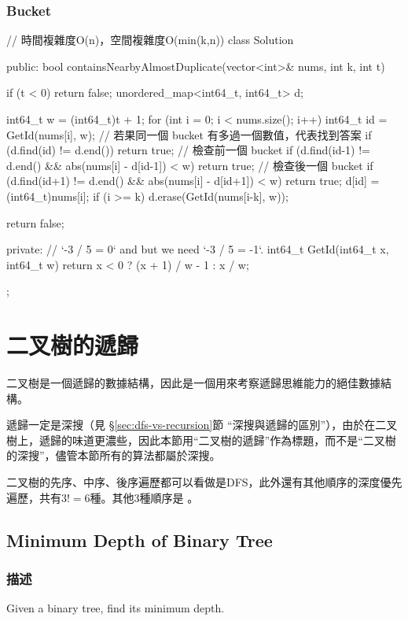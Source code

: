 \subsubsection{Bucket}
\begin{Code}
// 時間複雜度O(n)，空間複雜度O(min(k,n))
class Solution {
public:
    bool containsNearbyAlmostDuplicate(vector<int>& nums, int k, int t) {
        if (t < 0) return false;
        unordered_map<int64_t, int64_t> d;

        int64_t w = (int64_t)t + 1;
        for (int i = 0; i < nums.size(); i++)
        {
            int64_t id = GetId(nums[i], w);
            // 若果同一個 bucket 有多過一個數值，代表找到答案
            if (d.find(id) != d.end())
                return true;
            // 檢查前一個 bucket
            if (d.find(id-1) != d.end() && abs(nums[i] - d[id-1]) < w)
                return true;
            // 檢查後一個 bucket
            if (d.find(id+1) != d.end() && abs(nums[i] - d[id+1]) < w)
                return true;
            d[id] = (int64_t)nums[i];
            if (i >= k) d.erase(GetId(nums[i-k], w));
        }

        return false;
    }
private:
    // `-3 / 5 = 0` and but we need `-3 / 5 = -1`.
    int64_t GetId(int64_t x, int64_t w)
    {
        return x < 0 ? (x + 1) / w - 1 : x / w;
    }
};
\end{Code}

\section{二叉樹的遞歸} %
二叉樹是一個遞歸的數據結構，因此是一個用來考察遞歸思維能力的絕佳數據結構。

遞歸一定是深搜（見 \S \ref{sec:dfs-vs-recursion}節 “深搜與遞歸的區別”），由於在二叉樹上，遞歸的味道更濃些，因此本節用“二叉樹的遞歸”作為標題，而不是“二叉樹的深搜”，儘管本節所有的算法都屬於深搜。

二叉樹的先序、中序、後序遍歷都可以看做是DFS，此外還有其他順序的深度優先遍歷，共有$3!=6$種。其他3種順序是 。


\subsection{Minimum Depth of Binary Tree}
\label{sec:minimum-depth-of-binary-tree}


\subsubsection{描述}
Given a binary tree, find its minimum depth.


